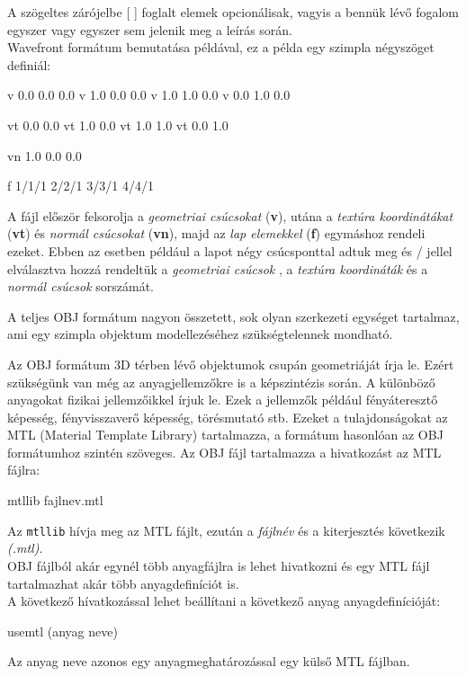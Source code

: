 \noindent A szögeltes zárójelbe [  ] foglalt elemek opcionálisak, vagyis a bennük lévő fogalom egyszer vagy egyszer sem jelenik meg a leírás során. \\

Wavefront formátum bemutatása példával, ez a példa egy szimpla négyszöget definiál:
\bigskip
\begin{python} 
v 0.0 0.0 0.0
v 1.0 0.0 0.0
v 1.0 1.0 0.0
v 0.0 1.0 0.0

vt 0.0 0.0
vt 1.0 0.0
vt 1.0 1.0
vt 0.0 1.0

vn 1.0 0.0 0.0 

f 1/1/1 2/2/1 3/3/1 4/4/1
\end{python}
\bigskip
A fájl először felsorolja a \textsl{geometriai csúcsokat} (\textbf{v}), utána a \textsl{textúra koordinátákat} (\textbf{vt}) és \textsl{normál csúcsokat} (\textbf{vn}), majd az \textsl{lap elemekkel} (\textbf{f}) egymáshoz rendeli ezeket. Ebben az esetben például a lapot négy csúcsponttal adtuk meg és {/} jellel elválasztva hozzá rendeltük a  \textsl{geometriai csúcsok} , a \textsl{textúra koordináták} és a \textsl{normál csúcsok} sorszámát.

A teljes OBJ formátum nagyon összetett, sok olyan szerkezeti egységet tartalmaz, ami egy szimpla objektum modellezéséhez szükségtelennek mondható.


Az OBJ formátum 3D térben lévő objektumok csupán geometriáját írja le. Ezért szükségünk van még az anyagjellemzőkre is a képszintézis során. A különböző anyagokat fizikai jellemzőikkel írjuk le. Ezek a jellemzők például fényáteresztő képesség, fényvisszaverő képesség, törésmutató stb.\cite{diane1995mtl}\newpage
Ezeket a tulajdonságokat az MTL (Material Template Library) tartalmazza, a formátum hasonlóan az OBJ formátumhoz szintén szöveges. Az OBJ fájl tartalmazza a hivatkozást az {MTL} fájlra:
\bigskip
\begin{python}
mtllib fajlnev.mtl
\end{python}
\bigskip
Az \texttt{mtllib} hívja meg az MTL fájlt, ezután a \textsl{fájlnév} és a kiterjesztés következik \textsl{(.mtl)}.\\
OBJ fájlból akár egynél több anyagfájlra is lehet hivatkozni és egy MTL fájl tartalmazhat akár több anyagdefiníciót is.\\

\noindent A következő hívatkozással lehet beállítani a következő anyag anyagdefinícióját:
\bigskip
\begin{python}
usemtl (anyag neve)
\end{python}
\bigskip
Az anyag neve azonos egy anyagmeghatározással egy külső MTL fájlban.\\

